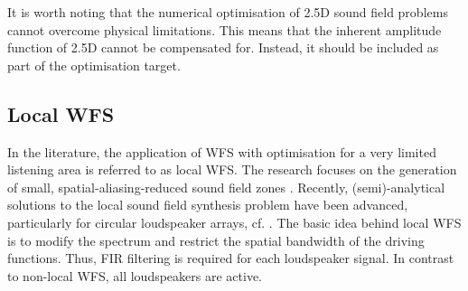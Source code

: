 It is worth noting that the numerical optimisation of 2.5D sound field
problems cannot overcome physical limitations.
This means that the inherent amplitude function of 2.5D cannot be
compensated for.
Instead, it should be included as part of the optimisation target.



\subsection{Local WFS}

In the literature, the application of WFS with optimisation for a very
limited listening area is referred to as local WFS.
%
The research focuses on the generation of small, spatial-aliasing-reduced sound
field zones \cite{Corteel2008_AES}.
Recently, (semi)-analytical solutions to the local sound field synthesis
problem have been advanced, particularly for circular loudspeaker arrays,
cf. \cite{Winter2019_diss,Hahn2019,Hahn2022_JAES}.
%
The basic idea behind local WFS is to modify the spectrum and restrict the
spatial bandwidth of the driving functions.
Thus, FIR filtering is required for each loudspeaker signal.
In contrast to non-local WFS, all loudspeakers are active.



